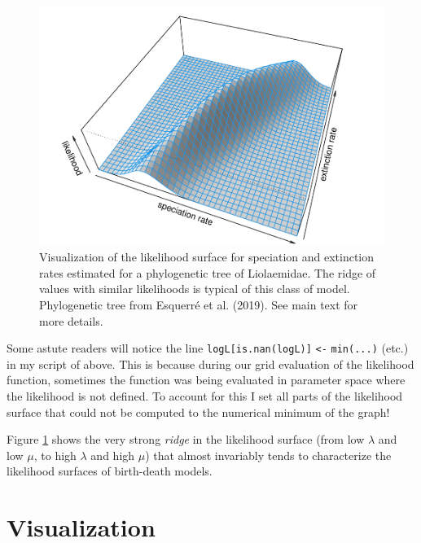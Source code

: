\documentclass[fleqn,10pt,lineno]{wlpeerj} %
\begin{document}
\begin{figure}
\includegraphics[width=1\linewidth]{Revell.phytools-v2_peerj_files/figure-latex/fig18-liol-bd-3d-1} \caption{Visualization of the likelihood surface for speciation and extinction rates estimated for a phylogenetic tree of Liolaemidae. The ridge of values with similar likelihoods is typical of this class of model. Phylogenetic tree from Esquerr\'e et al. (2019). See main text for more details.}\label{fig:fig18-liol-bd-3d}
\end{figure}

Some astute readers will notice the line \texttt{logL{[}is.nan(logL){]}} \texttt{\textless{}-} \texttt{min(...)} (etc.) in my script of above. This is because during our grid evaluation of the likelihood function, sometimes the function was being evaluated in parameter space where the likelihood is not defined. To account for this I set all parts of the likelihood surface that could not be computed to the numerical minimum of the graph!

Figure \ref{fig:fig18-liol-bd-3d} shows the very strong \emph{ridge} in the likelihood surface (from low \(\lambda\) and low \(\mu\), to high \(\lambda\) and high \(\mu\)) that almost invariably tends to characterize the likelihood surfaces of birth-death models.

\hypertarget{visualization}{%
\section{Visualization}\label{visualization}}
\end{document}
